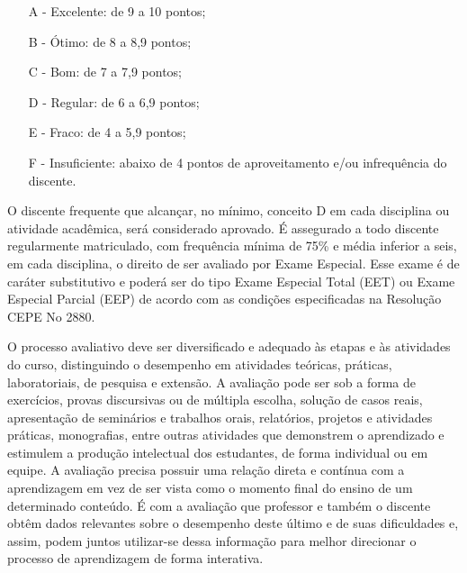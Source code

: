 \documentclass[
	12pt,				%
	openright,			%
	oneside,			%
	a4paper,			%
	english,			%
	brazil				%
	]{abntex2}
\begin{document}
\begin{itemize}
\item[A -] Excelente: de 9 a 10 pontos;
\item[B -] Ótimo: de 8 a 8,9 pontos;
\item[C -] Bom: de 7 a 7,9 pontos;
\item[D -] Regular: de 6 a 6,9 pontos;
\item[E -] Fraco: de 4 a 5,9 pontos;
\item[F -] Insuficiente: abaixo de 4 pontos de aproveitamento e/ou infrequência do discente.
\end{itemize}

O discente frequente que alcançar, no mínimo, conceito D em cada disciplina ou atividade acadêmica, será considerado aprovado. É assegurado a todo discente regularmente matriculado, com frequência mínima de 75\% e média inferior a seis, em cada disciplina, o direito de ser avaliado por Exame Especial. Esse exame é de caráter substitutivo e poderá ser do tipo Exame Especial Total (EET) ou Exame Especial Parcial (EEP) de acordo com as condições especificadas na Resolução CEPE No 2880.

O processo avaliativo deve ser diversificado e adequado às etapas e às atividades do curso, distinguindo o desempenho em atividades teóricas, práticas, laboratoriais, de pesquisa e extensão. A avaliação pode ser sob a forma de exercícios, provas discursivas ou de múltipla escolha, solução de casos reais, apresentação de seminários e trabalhos orais, relatórios, projetos e atividades práticas, monografias, entre outras atividades que demonstrem o aprendizado e estimulem a produção intelectual dos estudantes, de forma individual ou em equipe.
A avaliação precisa possuir uma relação direta e contínua com a aprendizagem em vez de ser vista como o momento final do ensino de um determinado conteúdo. É com a avaliação que professor e também o discente obtêm dados relevantes sobre o desempenho deste último e de suas dificuldades e, assim, podem juntos utilizar-se dessa informação para melhor direcionar o processo de aprendizagem de forma interativa.
\end{document}
